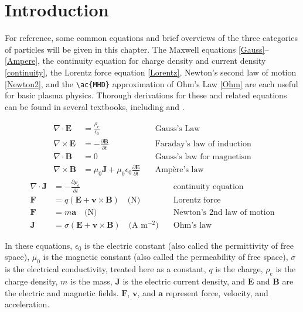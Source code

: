 \section{Introduction}
\label{Transport Intro}
For reference, some common equations and brief overviews of the three categories of particles will be given in this chapter. The Maxwell equations \eqref{Gauss}--\!\,\eqref{Ampere}, the continuity equation for charge density and current density \eqref{continuity}, the Lorentz force equation \eqref{Lorentz}, Newton's second law of motion \eqref{Newton2}, and the \verb!\ac{MHD}! approximation of Ohm's Law \eqref{Ohm} are each useful for basic plasma physics. Thorough derivations for these and related equations can be found in several textbooks, including \citet{gombosi98} and \citet{jackson99}.

\begin{subequations}
 \begin{align}
  \nabla\cdot\mathbf{E}&=\frac{\rho_e}{\epsilon_0}&\quad\text{Gauss's Law}
  \label{Gauss}\\
  \nabla\times\mathbf{E}&=-\frac{\partial\mathbf{B}}{\partial t}&\quad\text{Faraday's law of induction}
  \label{Faraday}\\
  \nabla\cdot\mathbf{B}&=0&\quad\text{Gauss's law for magnetism}
  \label{Gauss m}\\
  \nabla\times\mathbf{B}&=\mu_0\mathbf{J}+\mu_0\epsilon_0\frac{\partial\mathbf{E}}{\partial t}&\quad\text{Amp\`{e}re's law}
  \label{Ampere}
 \end{align}
\end{subequations}
\begin{align}
 \nabla\cdot\mathbf{J}&=-\frac{\partial\rho_e}{\partial t}&\quad\text{continuity equation}
 \label{continuity}\\
 \mathbf{F}&=q\left(\mathbf{E}+\mathbf{v}\times\mathbf{B}\right)\quad\text{(N)}&\quad\text{Lorentz force}
 \label{Lorentz}\\
 \mathbf{F}&=m\mathbf{a}\quad\text{(N)}&\quad\text{Newton's 2nd law of motion}
 \label{Newton2}\\
 \mathbf{J}&=\sigma\left(\mathbf{E+v\times B}\right)\quad\text{(A m$^{-2}$)}&\quad\text{Ohm's law}
 \label{Ohm}
\end{align}

In these equations, $\epsilon_0$ is the electric constant (also called the permittivity of free space), $\mu_0$ is the magnetic constant (also called the permeability of free space), $\sigma$ is the electrical conductivity, treated here as a constant, $q$ is the charge, $\rho_e$ is the charge density, $m$ is the mass, $\mathbf{J}$ is the electric current density, and $\mathbf{E}$ and $\mathbf{B}$ are the electric and magnetic fields. $\mathbf{F}$, $\mathbf{v}$, and $\mathbf{a}$ represent force, velocity, and acceleration. 

